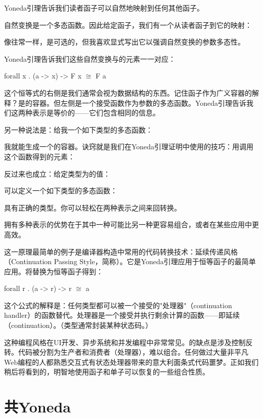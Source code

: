 Yoneda引理告诉我们读者函子可以自然地映射到任何其他函子。

自然变换是一个多态函数。因此给定函子，我们有一个从读者函子到它的映射：

像往常一样，是可选的，但我喜欢显式写出它以强调自然变换的参数多态性。

Yoneda引理告诉我们这些自然变换与的元素一一对应：

\begin{snipv}
forall x . (a -> x) -> F x \ensuremath{\cong} F a
\end{snipv}
这个恒等式的右侧是我们通常会视为数据结构的东西。记住函子作为广义容器的解释？是的容器。但左侧是一个接受函数作为参数的多态函数。Yoneda引理告诉我们这两种表示是等价的——它们包含相同的信息。

另一种说法是：给我一个如下类型的多态函数：

我就能生成一个的容器。诀窍就是我们在Yoneda引理证明中使用的技巧：用调用这个函数得到的元素：

反过来也成立：给定类型为的值：

可以定义一个如下类型的多态函数：

具有正确的类型。你可以轻松在两种表示之间来回转换。

拥有多种表示的优势在于其中一种可能比另一种更容易组合，或者在某些应用中更高效。

这一原理最简单的例子是编译器构造中常用的代码转换技术：延续传递风格（Continuation Passing Style，简称）。它是Yoneda引理应用于恒等函子的最简单应用。将替换为恒等函子得到：

\begin{snipv}
forall r . (a -> r) -> r \ensuremath{\cong} a
\end{snipv}
这个公式的解释是：任何类型都可以被一个接受的"处理器"（continuation handler）的函数替代。处理器是一个接受并执行剩余计算的函数——即延续（continuation）。（类型通常封装某种状态码。）

这种编程风格在UI开发、异步系统和并发编程中非常常见。的缺点是涉及控制反转。代码被分割为生产者和消费者（处理器），难以组合。任何做过大量非平凡Web编程的人都熟悉交互式有状态处理器带来的意大利面条式代码噩梦。正如我们稍后将看到的，明智地使用函子和单子可以恢复的一些组合性质。

\section{共Yoneda}

